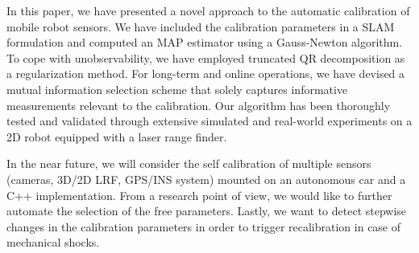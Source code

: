 In this paper, we have presented a novel approach to the automatic calibration
of mobile robot sensors. We have included the calibration parameters in a SLAM
formulation and computed an MAP estimator using a Gauss-Newton algorithm. To
cope with unobservability, we have employed truncated QR decomposition as a
regularization method. For long-term and online operations, we have devised
a mutual information selection scheme that solely captures informative
measurements relevant to the calibration. Our algorithm has been thoroughly
tested and validated through extensive simulated and real-world experiments on
a 2D robot equipped with a laser range finder.

In the near future, we will consider the self calibration of multiple sensors
(cameras, 3D/2D LRF, GPS/INS system) mounted on an autonomous car and a C++
implementation. From a research point of view, we would like to further automate
the selection of the free parameters. Lastly, we want to detect stepwise changes
in the calibration parameters in order to trigger recalibration in case of
mechanical shocks.
